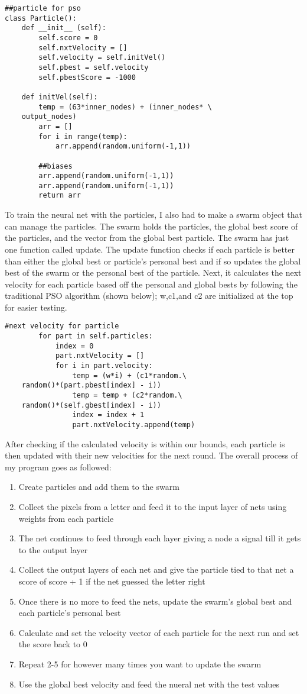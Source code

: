 \documentclass[letterpaper]{article}
\begin{document}
\begin{lstlisting} 
##particle for pso
class Particle():
    def __init__ (self):
        self.score = 0
        self.nxtVelocity = []
        self.velocity = self.initVel()
        self.pbest = self.velocity
        self.pbestScore = -1000

    def initVel(self):
        temp = (63*inner_nodes) + (inner_nodes* \
	output_nodes)
        arr = []
        for i in range(temp):
            arr.append(random.uniform(-1,1))
        
        ##biases
        arr.append(random.uniform(-1,1))
        arr.append(random.uniform(-1,1))
        return arr
\end{lstlisting}
To train the neural net with the particles, I also had to make a swarm object that can manage the particles. The swarm holds the particles, the global best score of the particles, and the vector from the global best particle. The swarm has just one function called update. The update function checks if each particle is better than either the global best or particle's personal best and if so updates the global best of the swarm or the personal best of the particle. Next, it calculates the next velocity for each particle based off the personal and global bests by following the traditional PSO algorithm (shown below); w,c1,and c2 are initialized at the top for easier testing.
\begin{lstlisting}
#next velocity for particle
        for part in self.particles:
            index = 0
            part.nxtVelocity = []
            for i in part.velocity:
                temp = (w*i) + (c1*random.\
	random()*(part.pbest[index] - i))
                temp = temp + (c2*random.\
	random()*(self.gbest[index] - i))
                index = index + 1
                part.nxtVelocity.append(temp)
\end{lstlisting}
After checking if the calculated velocity is within our bounds, each particle is then updated with their new velocities for the next round. The overall process of my program goes as followed:

\begin{enumerate}
\item Create particles and add them to the swarm
\item Collect the pixels from a letter and feed it to the input layer of nets using weights from each particle
\item The net continues to feed through each layer giving a node a signal till it gets to the output layer
\item Collect the output layers of each net and give the particle tied to that net a score of score + 1 if the net guessed the letter right
\item Once there is no more to feed the nets, update the swarm's global best and each particle's personal best
\item Calculate and set the velocity vector of each particle for the next run and set the score back to 0
\item Repeat 2-5 for however many times you want to update the swarm
\item Use the global best velocity and feed the nueral net with the test values
\end{enumerate}
\end{document}
